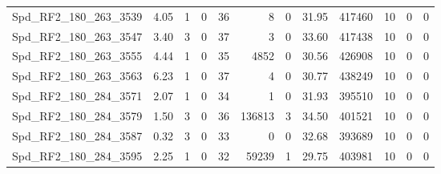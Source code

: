 \begin{longtable}[c]{@{}lrrrrrrrrrrr@{}}
Spd\_RF2\_180\_263\_3539      & 4.05                   & 1                       & 0                       & 36                     & 8                       & 0                       & 31.95                   & 417460                   & 10                       & 0                        & 0                        \\
Spd\_RF2\_180\_263\_3547      & 3.40                   & 3                       & 0                       & 37                     & 3                       & 0                       & 33.60                   & 417438                   & 10                       & 0                        & 0                        \\
Spd\_RF2\_180\_263\_3555      & 4.44                   & 1                       & 0                       & 35                     & 4852                    & 0                       & 30.56                   & 426908                   & 10                       & 0                        & 0                        \\
Spd\_RF2\_180\_263\_3563      & 6.23                   & 1                       & 0                       & 37                     & 4                       & 0                       & 30.77                   & 438249                   & 10                       & 0                        & 0                        \\
Spd\_RF2\_180\_284\_3571      & 2.07                   & 1                       & 0                       & 34                     & 1                       & 0                       & 31.93                   & 395510                   & 10                       & 0                        & 0                        \\
Spd\_RF2\_180\_284\_3579      & 1.50                   & 3                       & 0                       & 36                     & 136813                  & 3                       & 34.50                   & 401521                   & 10                       & 0                        & 0                        \\
Spd\_RF2\_180\_284\_3587      & 0.32                   & 3                       & 0                       & 33                     & 0                       & 0                       & 32.68                   & 393689                   & 10                       & 0                        & 0                        \\
Spd\_RF2\_180\_284\_3595      & 2.25                   & 1                       & 0                       & 32                     & 59239                   & 1                       & 29.75                   & 403981                   & 10                       & 0                        & 0                        \\

\end{longtable}
